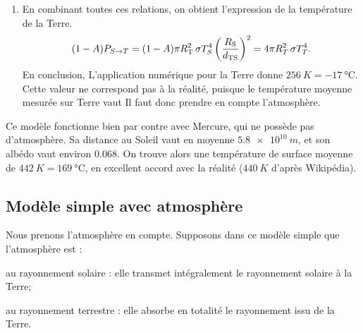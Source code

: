 \documentclass[12pt,fancy]{cours}
\begin{document}
\begin{enumerate}
\begin{equation}
P_{\rm{a}} = P_{\rm{e}} = 4\pi R_T^2 \,\sigma T_T^4.
\end{equation}
\item En combinant toutes ces relations, on obtient l'expression de la température de la Terre.
\begin{align*}
(1-A) P_{S \rightarrow T} = (1-A)\pi  R_{\rm{T}}^2 \,\sigma T_S^4 \left(\frac{R_{\rm{S}}}{d_{\rm{TS}}}\right)^2  = 4\pi R_T^2 \,\sigma T_T^4.
\end{align*}
En conclusion,
L'application numérique pour la Terre donne $\SI{256}{K}=\SI{-17}{\celsius}$. Cette valeur ne correspond pas à la réalité, puisque le température moyenne mesurée sur Terre vaut 
Il faut donc prendre en compte l'atmosphère.
\end{enumerate}


\begin{remarque}
Ce modèle fonctionne bien par contre avec Mercure, qui ne possède pas d'atmosphère. Sa distance au Soleil vaut en moyenne $\SI{5,8e10}{m}$, et son albédo vaut environ $\num{0,068}$. On trouve alors une température de surface moyenne de $\SI{442}{K}=\SI{169}{\celsius}$, en excellent accord avec la réalité ($\SI{440}{K}$ d'après Wikipédia).
\end{remarque}

\subsection{Modèle simple avec atmosphère}

Nous prenons l'atmosphère en compte.
Supposons dans ce modèle simple que l'atmosphère est :
\begin{liste}
\item {} au rayonnement solaire : elle transmet intégralement le rayonnement solaire à la Terre;
\item {} au rayonnement terrestre : elle absorbe en totalité le rayonnement issu de la Terre.
\end{liste}
\end{document}
